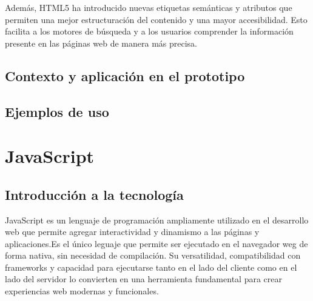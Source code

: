 \documentclass[a4paper, 11pt]{book}
\begin{document}
Además, HTML5 ha introducido nuevas etiquetas semánticas y atributos que permiten una mejor estructuración del contenido y una mayor accesibilidad. Esto facilita a los motores de búsqueda y a los usuarios comprender la información presente en las páginas web de manera más precisa.

\subsection{Contexto y aplicación en el prototipo}
\subsection{Ejemplos de uso}
\section{JavaScript}
\label{sec:javascript}
\subsection{Introducción a la tecnología}
JavaScript es un lenguaje de programación ampliamente utilizado en el desarrollo web que permite agregar interactividad y dinamismo a las páginas y aplicaciones.Es el único leguaje que permite ser ejecutado en el navegador weg de forma nativa, sin necesidad de compilación. Su versatilidad, compatibilidad con frameworks y capacidad para ejecutarse tanto en el lado del cliente como en el lado del servidor lo convierten en una herramienta fundamental para crear experiencias web modernas y funcionales.
\end{document}
